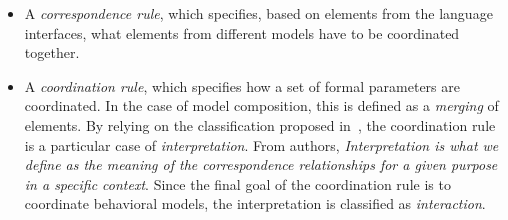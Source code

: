 \begin{itemize}
	\item A \emph{correspondence rule}, which specifies, based on elements from the language interfaces, what elements from different models have to be coordinated together.
	
	\item A \emph{coordination rule}, which specifies how a set of formal parameters are coordinated. In the case of model composition, this is defined as a \emph{merging} of elements. By relying on the classification proposed in~\cite{clavreulmodelcompo}, the coordination rule is a particular case of \emph{interpretation}. From authors, \emph{Interpretation is what we define as the meaning of the correspondence relationships for a given purpose in a specific context}. Since the final goal of the coordination rule is to coordinate behavioral models, the interpretation is classified as \emph{interaction}.  
 
\end{itemize}